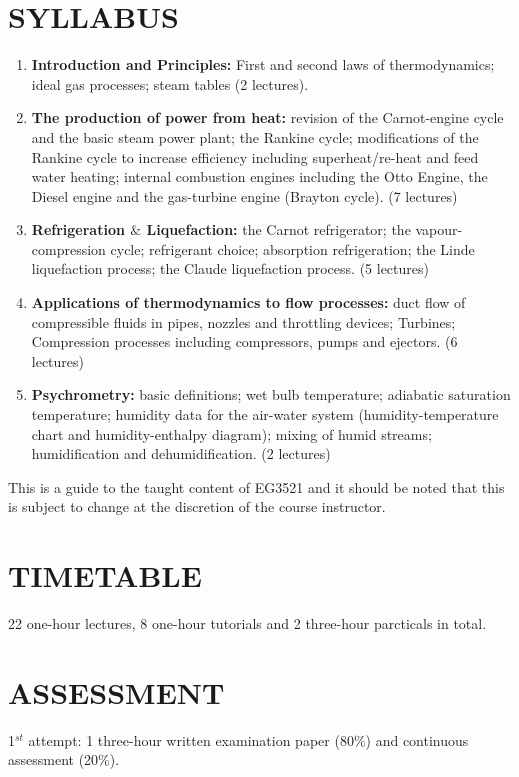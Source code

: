 \documentclass[12pts,a4paper,amsmath,amssymb,floatfix]{article}%
\begin{document}
\section{SYLLABUS}
\begin{enumerate}[{\bf Module 1.}]
   \item {\bf Introduction and Principles:} First and second laws of thermodynamics; ideal gas processes; steam tables (2 lectures).
   \item {\bf The production of power from heat:} revision of the Carnot-engine cycle and the basic steam power plant; the Rankine cycle; modifications of the Rankine cycle to increase efficiency including superheat/re-heat and feed water heating; internal combustion engines including the Otto Engine, the Diesel engine and the gas-turbine engine (Brayton cycle). (7 lectures)
   \item {\bf Refrigeration $\&$ Liquefaction:} the Carnot refrigerator; the vapour-compression cycle; refrigerant choice; absorption refrigeration; the Linde liquefaction process; the Claude liquefaction process. (5 lectures)
   \item {\bf Applications of thermodynamics to flow processes:} duct flow of compressible fluids in pipes, nozzles and throttling devices; Turbines; Compression processes including compressors, pumps and ejectors. (6 lectures)
   \item {\bf Psychrometry:} basic definitions; wet bulb temperature; adiabatic saturation temperature; humidity data for the air-water system (humidity-temperature chart and humidity-enthalpy diagram); mixing of humid streams; humidification and dehumidification. (2 lectures)
\end{enumerate}

\medskip
This is a guide to the taught content of EG3521 and it should be noted that this is subject to change at the discretion of the course instructor.


\section{TIMETABLE}
22 one-hour lectures, 8 one-hour tutorials and 2 three-hour parcticals in total. %


\section{ASSESSMENT}
1$^{st}$ attempt: 1 three-hour written examination paper (80$\%$) and continuous assessment (20$\%$). 
\medskip
\end{document}
